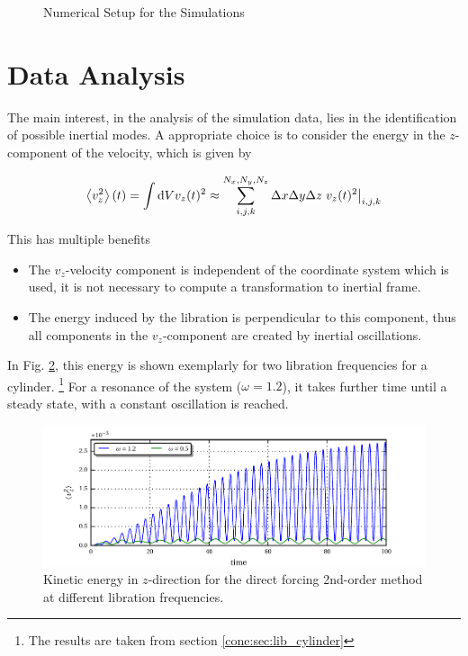 \begin{figure}[!bp]
  \centering
      \caption{Numerical Setup for the Simulations \label{cone:setup_image} }
\end{figure}
\clearpage

\section{Data Analysis}

The main interest, in the analysis of the simulation data, lies in the identification of possible inertial modes.
A appropriate choice is to consider the energy in the $z$-component of the  velocity, which is given by

\begin{align}
    \left<v_z^2 \right>(t) =  \int \mathop{}\!\mathrm{d} V v_z(t)^2 \approx \sum_{i, j, k}^{N_x,N_y,N_z} \Delta x \Delta y \Delta z \left.v_z(t)^2 \right|_{i,j,k}
\end{align}

This has multiple benefits

\begin{itemize}
    \item The $v_z$-velocity component is independent of the coordinate system which is used, it is not necessary
                to compute a transformation to inertial frame.
    \item The energy induced by the libration is perpendicular to this component, thus all components
            in the $v_z$-component are created by inertial oscillations.
\end{itemize}

In Fig. \ref{fig:cone:cyl_vzmode}, this energy is shown exemplarly for two libration frequencies for a cylinder.
\footnote{The results are taken from section \ref{cone:sec:lib_cylinder}}
For a resonance of the system ($\omega=1.2$), it takes further time until a steady state, with a constant oscillation is reached.

\begin{figure}[!pb]
  \includegraphics{gfx/cone/cylinder/cyl_vz.pdf}
  \caption{Kinetic energy in $z$-direction for the direct forcing 2nd-order method at different libration frequencies.
  \label{fig:cone:cyl_vzmode}
  }
\end{figure}
\clearpage


